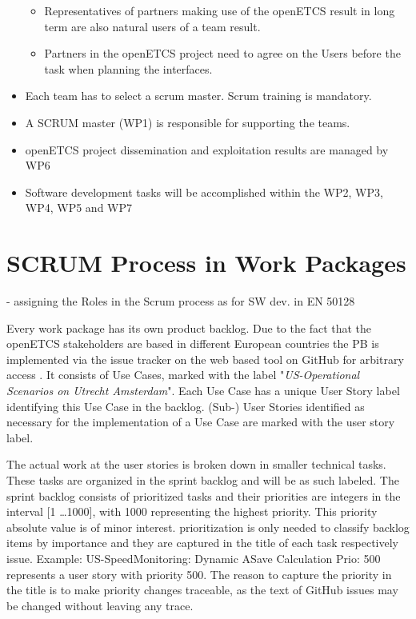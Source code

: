 \begin{itemize}
\begin{itemize}
		\item Representatives of partners making use of the openETCS result in long term are also natural users of a team result.
		\item Partners in the openETCS project need to agree on the Users before the task when planning the interfaces. 
	\end{itemize}  
	\item Each team has to select a scrum master. Scrum training is mandatory.
	\item A SCRUM master (WP1) is responsible for supporting the teams.
	\item openETCS project dissemination and exploitation results are managed by WP6
	\item Software development tasks will be accomplished within the WP2, WP3, WP4, WP5 and WP7  
\end{itemize}

 


\section{SCRUM Process in Work Packages}

- assigning the Roles in the Scrum process as for SW dev. in EN 50128

Every work package has its own product backlog. Due to the fact that the openETCS stakeholders are based in different European countries the PB is implemented via the issue tracker on the web based tool on GitHub for arbitrary access . It consists of Use Cases, marked with the label "\textit{US-Operational Scenarios on Utrecht Amsterdam}". Each Use Case has a unique User Story label identifying this Use Case in the backlog. (Sub-) User Stories identified as necessary for the implementation of a Use Case are marked with the user story label.

The actual work at the user stories is broken down in smaller technical tasks. These tasks are organized in the sprint backlog and will be as such labeled. The sprint backlog consists of prioritized tasks and their priorities are integers in the interval [1 \dots 1000], with 1000 representing the highest priority. This priority absolute value is of minor interest. prioritization is only needed to classify backlog items by importance and they are captured in the title of each task respectively issue. Example: US-SpeedMonitoring: Dynamic ASave Calculation Prio: 500 represents a user story with priority 500. The reason to capture the priority in the title is to make priority changes traceable, as the text of GitHub issues may be changed without leaving any trace.

